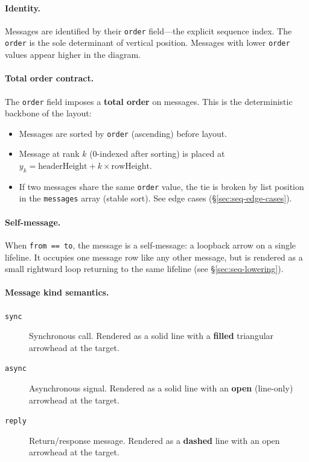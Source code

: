 \paragraph{Identity.}
Messages are identified by their \texttt{order} field---the explicit sequence index. The \texttt{order} is the sole determinant of vertical position. Messages with lower \texttt{order} values appear higher in the diagram.

\paragraph{Total order contract.}
The \texttt{order} field imposes a \textbf{total order} on messages. This is the deterministic backbone of the layout:
\begin{itemize}
  \item Messages are sorted by \texttt{order} (ascending) before layout.
  \item Message at rank $k$ (0-indexed after sorting) is placed at $y_k = \text{headerHeight} + k \times \text{rowHeight}$.
  \item If two messages share the same \texttt{order} value, the tie is broken by list position in the \texttt{messages} array (stable sort). See edge cases (\S\ref{sec:seq-edge-cases}).
\end{itemize}

\paragraph{Self-message.}
When \texttt{from == to}, the message is a self-message: a loopback arrow on a single lifeline. It occupies one message row like any other message, but is rendered as a small rightward loop returning to the same lifeline (see \S\ref{sec:seq-lowering}).

\paragraph{Message kind semantics.}
\begin{description}
  \item[\texttt{sync}] Synchronous call. Rendered as a solid line with a \textbf{filled} triangular arrowhead at the target.
  \item[\texttt{async}] Asynchronous signal. Rendered as a solid line with an \textbf{open} (line-only) arrowhead at the target.
  \item[\texttt{reply}] Return/response message. Rendered as a \textbf{dashed} line with an open arrowhead at the target.
\end{description}


